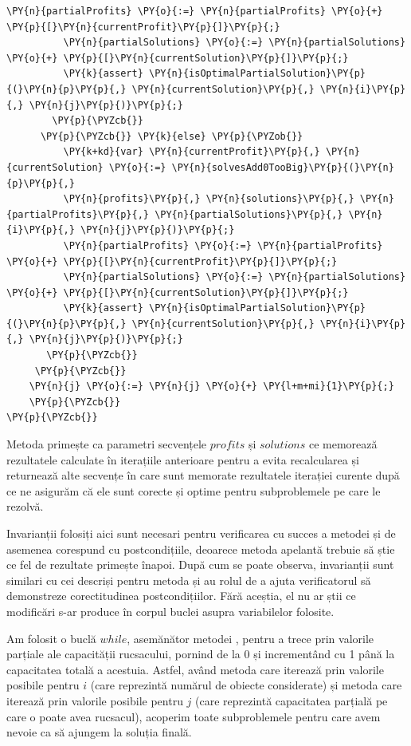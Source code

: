 \begin{sloppypar}
\begin{Verbatim}[commandchars=\\\{\}]
          \PY{n}{partialProfits} \PY{o}{:=} \PY{n}{partialProfits} \PY{o}{+} \PY{p}{[}\PY{n}{currentProfit}\PY{p}{]}\PY{p}{;}
          \PY{n}{partialSolutions} \PY{o}{:=} \PY{n}{partialSolutions} \PY{o}{+} \PY{p}{[}\PY{n}{currentSolution}\PY{p}{]}\PY{p}{;}
          \PY{k}{assert} \PY{n}{isOptimalPartialSolution}\PY{p}{(}\PY{n}{p}\PY{p}{,} \PY{n}{currentSolution}\PY{p}{,} \PY{n}{i}\PY{p}{,} \PY{n}{j}\PY{p}{)}\PY{p}{;}
        \PY{p}{\PYZcb{}}
      \PY{p}{\PYZcb{}} \PY{k}{else} \PY{p}{\PYZob{}}
          \PY{k+kd}{var} \PY{n}{currentProfit}\PY{p}{,} \PY{n}{currentSolution} \PY{o}{:=} \PY{n}{solvesAdd0TooBig}\PY{p}{(}\PY{n}{p}\PY{p}{,} 
          \PY{n}{profits}\PY{p}{,} \PY{n}{solutions}\PY{p}{,} \PY{n}{partialProfits}\PY{p}{,} \PY{n}{partialSolutions}\PY{p}{,} \PY{n}{i}\PY{p}{,} \PY{n}{j}\PY{p}{)}\PY{p}{;}
          \PY{n}{partialProfits} \PY{o}{:=} \PY{n}{partialProfits} \PY{o}{+} \PY{p}{[}\PY{n}{currentProfit}\PY{p}{]}\PY{p}{;}
          \PY{n}{partialSolutions} \PY{o}{:=} \PY{n}{partialSolutions} \PY{o}{+} \PY{p}{[}\PY{n}{currentSolution}\PY{p}{]}\PY{p}{;}
          \PY{k}{assert} \PY{n}{isOptimalPartialSolution}\PY{p}{(}\PY{n}{p}\PY{p}{,} \PY{n}{currentSolution}\PY{p}{,} \PY{n}{i}\PY{p}{,} \PY{n}{j}\PY{p}{)}\PY{p}{;}
       \PY{p}{\PYZcb{}}
     \PY{p}{\PYZcb{}}
    \PY{n}{j} \PY{o}{:=} \PY{n}{j} \PY{o}{+} \PY{l+m+mi}{1}\PY{p}{;}
    \PY{p}{\PYZcb{}}
\PY{p}{\PYZcb{}}
\end{Verbatim} 
    \par Metoda primește ca parametri secvențele $profits$ și $solutions$ ce memorează rezultatele calculate în iterațiile anterioare pentru a evita recalcularea și returnează alte secvențe în care sunt memorate rezultatele iterației curente după ce ne asigurăm că ele sunt corecte și optime pentru subproblemele pe care le rezolvă. \par
    Invarianții folosiți aici sunt necesari pentru verificarea cu succes a metodei și de asemenea corespund cu postcondițiile, deoarece metoda apelantă  trebuie să știe ce fel de rezultate primește înapoi. După cum se poate observa, invarianții sunt similari cu cei descriși pentru metoda  și au rolul de a ajuta verificatorul să demonstreze corectitudinea postcondițiilor. Fără aceștia, el nu ar știi ce modificări s-ar produce în corpul buclei asupra variabilelor folosite. \par
    Am folosit o buclă $while$, asemănător metodei , pentru a trece prin valorile parțiale ale capacității rucsacului, pornind de la 0 și incrementând cu 1 până la capacitatea totală a acestuia. Astfel, având metoda  care iterează prin valorile posibile pentru $i$ (care reprezintă numărul de obiecte considerate) și metoda  care iterează prin valorile posibile pentru $j$ (care reprezintă capacitatea parțială pe care o poate avea rucsacul), acoperim toate subproblemele pentru care avem nevoie ca să ajungem la soluția finală. \par

\end{sloppypar}
